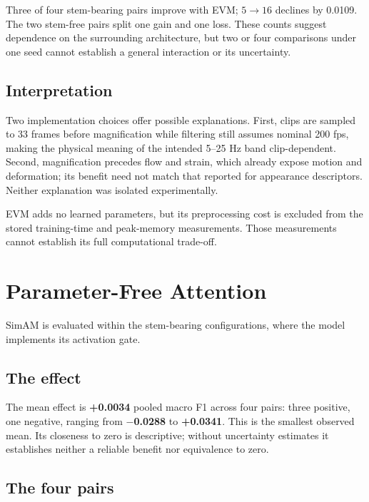 Three of four stem-bearing pairs improve with EVM; $5\rightarrow16$ declines by 0.0109. The two stem-free pairs split one gain and one loss. These counts suggest dependence on the surrounding architecture, but two or four comparisons under one seed cannot establish a general interaction or its uncertainty.

\subsection{Interpretation}
\label{sec:evm-interpretation-result}

Two implementation choices offer possible explanations. First, clips are sampled to 33 frames before magnification while filtering still assumes nominal 200 fps, making the physical meaning of the intended 5--25 Hz band clip-dependent. Second, magnification precedes flow and strain, which already expose motion and deformation; its benefit need not match that reported for appearance descriptors. Neither explanation was isolated experimentally.

EVM adds no learned parameters, but its preprocessing cost is excluded from the stored training-time and peak-memory measurements. Those measurements cannot establish its full computational trade-off.

\section{Parameter-Free Attention}
\label{sec:simam-results}

SimAM is evaluated within the stem-bearing configurations, where the model implements its activation gate.

\subsection{The effect}
\label{sec:simam-effect-result}

The mean effect is \textbf{+0.0034} pooled macro F1 across four pairs: three positive, one negative, ranging from \textbf{$-$0.0288} to \textbf{+0.0341}. This is the smallest observed mean. Its closeness to zero is descriptive; without uncertainty estimates it establishes neither a reliable benefit nor equivalence to zero.

\subsection{The four pairs}
\label{sec:simam-four-pairs}

